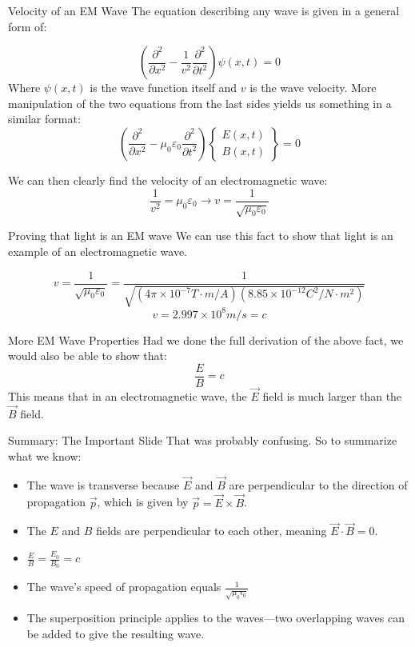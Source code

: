 \documentclass{beamer}
\begin{document}
\begin{frame}{Velocity of an EM Wave}
    The equation describing any wave is given in a general form of:

    \[ \left(\frac{\partial^2}{\partial x^2}-\frac{1}{v^2}\frac{\partial^2}{\partial t^2}\right)\psi(x,t)=0 \]
    Where $\psi(x,t)$ is the wave function itself and $v$ is the wave velocity. More manipulation of the two equations from the last sides yields us something in a similar format:
    \[  \left(\frac{\partial^2}{\partial x^2}-\mu_0\varepsilon_0\frac{\partial^2}{\partial t^2}\right)\left\{ \begin{array}{c} E(x,t) \\ B(x,t) \end{array} \right\}=0 \]

    We can then clearly find the velocity of an electromagnetic wave:
    \[ \frac{1}{v^2} = \mu_0\varepsilon_0 \longrightarrow v = \frac{1}{\sqrt{\mu_0\varepsilon_0}}\]
\end{frame}

\begin{frame}{Proving that light is an EM wave}
    We can use this fact to show that light is an example of an electromagnetic wave.
    
    \[ v=\frac{1}{\sqrt{\mu_{0} \varepsilon_{0}}}=\frac{1}{\sqrt{\left(4 \pi \times 10^{-7} T \cdot m/A\right)\left(8.85 \times 10^{-12} C^{2} / N \cdot m^{2}\right)}} \] 
    \[ v =2.997 \times 10^{8} m/s=c \]
\end{frame}

\begin{frame}{More EM Wave Properties}
    Had we done the full derivation of the above fact, we would also be able to show that:
    \[ \frac{E}{B} = c \] 
    This means that in an electromagnetic wave, the $\vec{E}$ field is much larger than the $\vec{B}$ field.
\end{frame}

\begin{frame}{Summary: The Important Slide}
    That was probably confusing. So to summarize what we know:
    \begin{itemize}
	\item The wave is transverse because $\vec{E}$ and $\vec{B}$ are perpendicular to the direction of propagation $\vec{p}$, which is given by $\vec{p} = \vec{E} \times \vec{B}$.
	\item The $E$ and $B$ fields are perpendicular to each other, meaning $\vec{E} \cdot \vec{B} = 0$.
	\item $\frac{E}{B} = \frac{E_0}{B_0} = c$
	\item The wave's speed of propagation equals $\frac{1}{\sqrt{\mu_0\epsilon_0}}$
	\item The superposition principle applies to the waves---two overlapping waves can be added to give the resulting wave.
    \end{itemize}
\end{frame}
\end{document}
